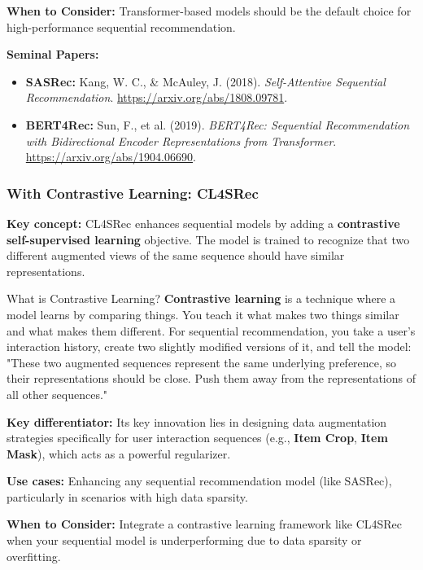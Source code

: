 \documentclass{article}
\begin{document}
\noindent\textbf{When to Consider:} Transformer-based models should be the default choice for high-performance sequential recommendation.

\noindent\textbf{Seminal Papers:}
    \begin{itemize}
        \item \textbf{SASRec:} Kang, W. C., \& McAuley, J. (2018). \textit{Self-Attentive Sequential Recommendation}. \url{https://arxiv.org/abs/1808.09781}.
        \item \textbf{BERT4Rec:} Sun, F., et al. (2019). \textit{BERT4Rec: Sequential Recommendation with Bidirectional Encoder Representations from Transformer}. \url{https://arxiv.org/abs/1904.06690}.
    \end{itemize}

    \subsubsection{With Contrastive Learning: CL4SRec}
\noindent\textbf{Key concept:} CL4SRec enhances sequential models by adding a \textbf{contrastive self-supervised learning} objective. The model is trained to recognize that two different augmented views of the same sequence should have similar representations.
    
    \begin{asidebox}{What is Contrastive Learning?}
\noindent\textbf{Contrastive learning} is a technique where a model learns by comparing things. You teach it what makes two things similar and what makes them different. For sequential recommendation, you take a user's interaction history, create two slightly modified versions of it, and tell the model: "These two augmented sequences represent the same underlying preference, so their representations should be close. Push them away from the representations of all other sequences."
    \end{asidebox}

\noindent\textbf{Key differentiator:} Its key innovation lies in designing data augmentation strategies specifically for user interaction sequences (e.g., \textbf{Item Crop}, \textbf{Item Mask}), which acts as a powerful regularizer.

\noindent\textbf{Use cases:} Enhancing any sequential recommendation model (like SASRec), particularly in scenarios with high data sparsity.

\noindent\textbf{When to Consider:} Integrate a contrastive learning framework like CL4SRec when your sequential model is underperforming due to data sparsity or overfitting.
\end{document}

